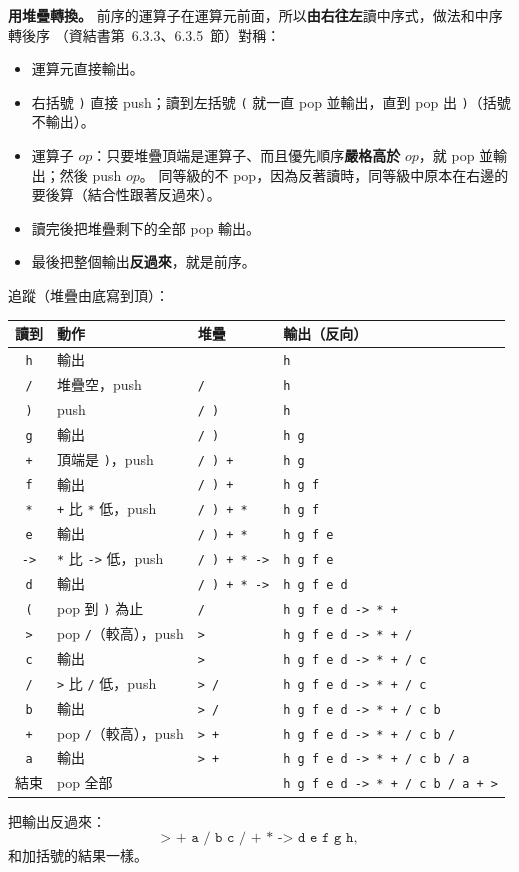 \begin{pastsoln}
\textbf{用堆疊轉換。} 前序的運算子在運算元前面，所以\textbf{由右往左}讀中序式，做法和中序轉後序
（資結書第~6.3.3、6.3.5~節）對稱：
\begin{itemize}
\item 運算元直接輸出。
\item 右括號 \texttt{)} 直接 push；讀到左括號 \texttt{(} 就一直 pop 並輸出，直到 pop 出 \texttt{)}（括號不輸出）。
\item 運算子 $op$：只要堆疊頂端是運算子、而且優先順序\textbf{嚴格高於} $op$，就 pop 並輸出；然後 push $op$。
同等級的不 pop，因為反著讀時，同等級中原本在右邊的要後算（結合性跟著反過來）。
\item 讀完後把堆疊剩下的全部 pop 輸出。
\item 最後把整個輸出\textbf{反過來}，就是前序。
\end{itemize}
追蹤（堆疊由底寫到頂）：
\begin{center}
\small
\begin{tabular}{clll}
\toprule
讀到 & 動作 & 堆疊 & 輸出（反向） \\
\midrule
\texttt{h} & 輸出 & & \texttt{h} \\
\texttt{/} & 堆疊空，push & \texttt{/} & \texttt{h} \\
\texttt{)} & push & \texttt{/ )} & \texttt{h} \\
\texttt{g} & 輸出 & \texttt{/ )} & \texttt{h g} \\
\texttt{+} & 頂端是 \texttt{)}，push & \texttt{/ ) +} & \texttt{h g} \\
\texttt{f} & 輸出 & \texttt{/ ) +} & \texttt{h g f} \\
\texttt{*} & \texttt{+} 比 \texttt{*} 低，push & \texttt{/ ) + *} & \texttt{h g f} \\
\texttt{e} & 輸出 & \texttt{/ ) + *} & \texttt{h g f e} \\
\texttt{->} & \texttt{*} 比 \texttt{->} 低，push & \texttt{/ ) + * ->} & \texttt{h g f e} \\
\texttt{d} & 輸出 & \texttt{/ ) + * ->} & \texttt{h g f e d} \\
\texttt{(} & pop 到 \texttt{)} 為止 & \texttt{/} & \texttt{h g f e d -> * +} \\
\texttt{>} & pop \texttt{/}（較高），push & \texttt{>} & \texttt{h g f e d -> * + /} \\
\texttt{c} & 輸出 & \texttt{>} & \texttt{h g f e d -> * + / c} \\
\texttt{/} & \texttt{>} 比 \texttt{/} 低，push & \texttt{> /} & \texttt{h g f e d -> * + / c} \\
\texttt{b} & 輸出 & \texttt{> /} & \texttt{h g f e d -> * + / c b} \\
\texttt{+} & pop \texttt{/}（較高），push & \texttt{> +} & \texttt{h g f e d -> * + / c b /} \\
\texttt{a} & 輸出 & \texttt{> +} & \texttt{h g f e d -> * + / c b / a} \\
結束 & pop 全部 & & \texttt{h g f e d -> * + / c b / a + >} \\
\bottomrule
\end{tabular}
\end{center}
把輸出反過來：
\[
\texttt{> + a / b c / + * -> d e f g h},
\]
和加括號的結果一樣。


\end{pastsoln}
